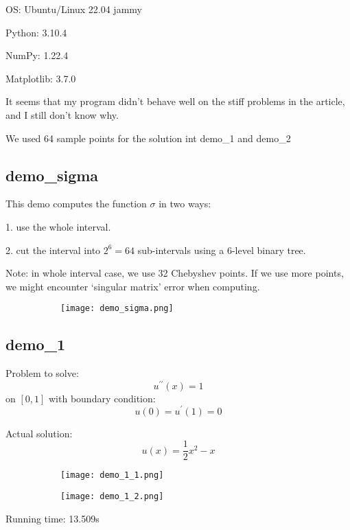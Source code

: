 \documentclass{article}
\begin{document}
OS: Ubuntu/Linux 22.04 jammy

Python: 3.10.4

NumPy: 1.22.4

Matplotlib: 3.7.0

It seems that my program didn't behave well on the stiff problems in the article, 
and I still don't know why.

We used 64 sample points for the solution int demo\_1 and demo\_2 

\subsection{demo\_sigma}

This demo computes the function $\sigma$ in two ways: 

1. use the whole interval.

2. cut the interval into $2^6 = 64$ sub-intervals using a 6-level binary tree.

Note: in whole interval case, we use 32 Chebyshev points. 
If we use more points, we might encounter `singular matrix' error when computing.

\begin{figure}[H]
	\centering
    \begin{subfigure}[h]{0.8\linewidth}
	    \texttt{[image: demo\_sigma.png]}
    \end{subfigure}
\end{figure}

\subsection{demo\_1}

Problem to solve:
$$
    u^{\prime\prime}(x) = 1
$$ on $[0, 1]$
with boundary condition:
$$
    u(0) = u^\prime(1) = 0
$$

Actual solution:
$$
    u(x) = \frac12 x^2 - x
$$

\begin{figure}[H]
	\centering
	\begin{subfigure}[h]{0.45\linewidth}
	    \texttt{[image: demo\_1\_1.png]}
    \end{subfigure}
    \begin{subfigure}[h]{0.45\linewidth}
	    \texttt{[image: demo\_1\_2.png]}
    \end{subfigure}
\end{figure}

Running time: 13.509s
\end{document}

